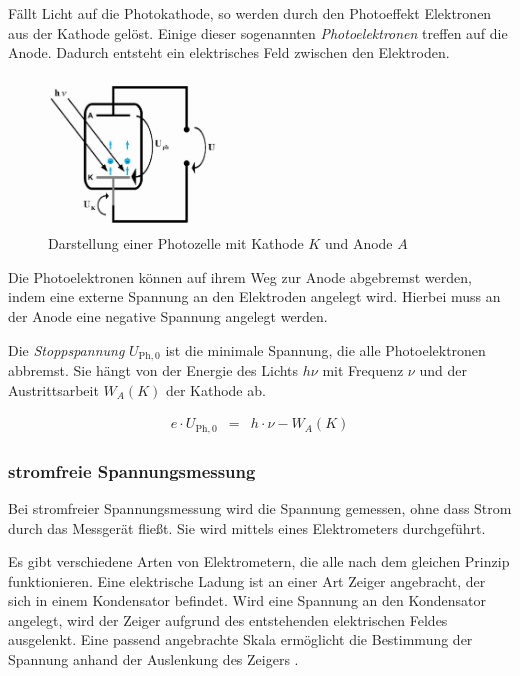\documentclass[12pt,a4paper]{scrartcl}
\numberwithin{equation}{section} %
\begin{document}
Fällt Licht auf die Photokathode, so werden durch den Photoeffekt Elektronen aus der Kathode gelöst. Einige dieser sogenannten \textit{Photoelektronen} treffen auf die Anode. Dadurch entsteht ein elektrisches Feld zwischen den Elektroden.

\begin{figure}[h]
	\centering
	\includegraphics[width=0.4\textwidth]{../media/B1.4/Photozelle.jpg}
	\caption{Darstellung einer Photozelle mit Kathode $K$ und Anode $A$ \cite{uni}}
	\label{fig:photozelle}
\end{figure}

Die Photoelektronen können auf ihrem Weg zur Anode abgebremst werden, indem eine externe Spannung an den Elektroden angelegt wird. Hierbei muss an der Anode eine negative Spannung angelegt werden.

Die \textit{Stoppspannung} $U_{\mathrm{Ph}, 0}$ ist die minimale Spannung, die alle Photoelektronen abbremst. Sie hängt von der Energie des Lichts $h\nu$ mit Frequenz $\nu$ und der Austrittsarbeit $W_A(K)$ der Kathode ab. \cite{Gerthsen}

\begin{eqnarray}
	e \cdot U_{\mathrm{Ph}, 0} &=& h \cdot \nu - W_A (K)
\end{eqnarray}

\subsubsection{stromfreie Spannungsmessung}
Bei stromfreier Spannungsmessung wird die Spannung gemessen, ohne dass Strom durch das Messgerät fließt. Sie wird mittels eines Elektrometers durchgeführt.

Es gibt verschiedene Arten von Elektrometern, die alle nach dem gleichen Prinzip funktionieren. Eine elektrische Ladung ist an einer Art Zeiger angebracht, der sich in einem Kondensator befindet. Wird eine Spannung an den Kondensator angelegt, wird der Zeiger aufgrund des entstehenden elektrischen Feldes ausgelenkt. Eine passend angebrachte Skala ermöglicht die Bestimmung der Spannung anhand der Auslenkung des Zeigers \cite{Gerthsen}.
\end{document}

